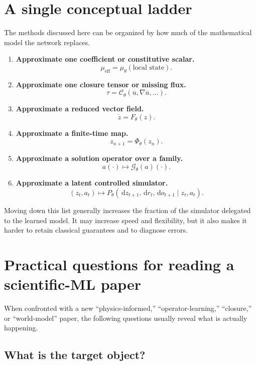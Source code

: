\documentclass[11pt]{article}
\newcommand{\C}{\mathcal{C}}
\newcommand{\G}{\mathcal{G}}
\newcommand{\dd}{\,\mathrm{d}}
\begin{document}
\section{A single conceptual ladder}

The methods discussed here can be organized by how much of the mathematical model the network replaces.

\begin{enumerate}
  \item \textbf{Approximate one coefficient or constitutive scalar.}
  \[
  \mu_{\mathrm{eff}}=\mu_\theta(\text{local state}).
  \]

  \item \textbf{Approximate one closure tensor or missing flux.}
  \[
  \tau=\C_\theta(\overline u,\nabla\overline u,\ldots).
  \]

  \item \textbf{Approximate a reduced vector field.}
  \[
  \dot z=F_\theta(z).
  \]

  \item \textbf{Approximate a finite-time map.}
  \[
  z_{n+1}=\Phi_\theta(z_n).
  \]

  \item \textbf{Approximate a solution operator over a family.}
  \[
  a(\cdot)\longmapsto\G_\theta(a)(\cdot).
  \]

  \item \textbf{Approximate a latent controlled simulator.}
  \[
  (z_t,a_t)\longmapsto P_\theta(\dd z_{t+1},\dd r_t,\dd o_{t+1}\mid z_t,a_t).
  \]
\end{enumerate}

Moving down this list generally increases the fraction of the simulator delegated to the learned model. It may increase speed and flexibility, but it also makes it harder to retain classical guarantees and to diagnose errors.

\section{Practical questions for reading a scientific-ML paper}

When confronted with a new ``physics-informed,'' ``operator-learning,'' ``closure,'' or ``world-model'' paper, the following questions usually reveal what is actually happening.

\subsection{What is the target object?}
\end{document}
